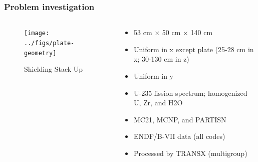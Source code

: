 \documentclass[xcolor=x11names,compress]{beamer}
\renewcommand{\(}{\begin{columns}}
\renewcommand{\)}{\end{columns}}
\newcommand{\<}[1]{\begin{column}{#1}}
\renewcommand{\>}{\end{column}}
\begin{document}
\begin{frame}[fragile]
  \frametitle{Problem investigation}
  	\begin{columns}
  	\begin{column}{0.4\textwidth}
  	\begin{figure}
  		\texttt{[image: ../figs/plate-geometry]}
  		\caption{Shielding Stack Up}
  	\end{figure}
  	\end{column}
 	\begin{column}{0.6\textwidth}
	\begin{itemize}
	\item 53 cm $\times$ 50 cm $\times$ 140 cm 
	\item Uniform in x except plate (25-28 cm in x; 30-130 cm in z)
	\item Uniform in y
	\item U-235 fission spectrum; homogenized U, Zr, and H2O
	\vspace*{1 em}
	\item MC21, MCNP, and PARTISN
	\item ENDF/B-VII data (all codes)
	\item Processed by TRANSX (multigroup)
	\end{itemize}
  	\end{column}
	\end{columns}
  
\end{frame}
\end{document}
